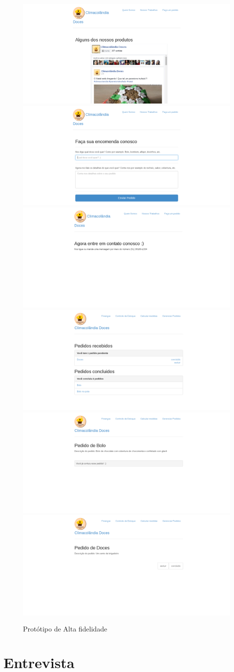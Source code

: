 \begin{figure}[!h]
	\centering
	\includegraphics[width=.47\textwidth]{figuras/p4.png}
	\includegraphics[width=.47\textwidth]{figuras/p5.png}
	\includegraphics[width=.47\textwidth]{figuras/p6.png}
	\includegraphics[width=.47\textwidth]{figuras/p7.png}
	\includegraphics[width=.47\textwidth]{figuras/p8.png}
	\includegraphics[width=.47\textwidth]{figuras/p9.png}
	\caption{Protótipo de Alta fidelidade}
	\label{fig:p2}
\end{figure}

\section{Entrevista}

